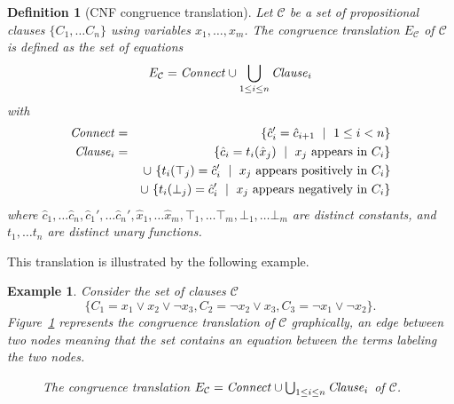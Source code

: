 \documentclass{easychair}
\newtheorem{example}{Example}
\newtheorem{definition}{Definition}
\begin{document}
\begin{definition}[CNF congruence translation]

Let $\mathcal{C}$ be a set of propositional clauses $\{C_1,\ldots C_n\}$ using variables $x_1,\ldots,x_m$.
The \emph{congruence translation} $E_{\mathcal{C}}$ of\/ $\mathcal{C}$ is defined as the set of equations
\begin{equation*}
E_{\mathcal{C}} = {\it Connect} \cup \bigcup_{1 \leq i \leq n}{\it Clause}_i 
\end{equation*}
with
\begin{eqnarray*}
	{\it Connect} &=& \{ \hat{c}_{i}' = \hat{c}_{i+1} \ \mid\ 1 \leq i < n\}\\
        {\it Clause}_i &=& \{ \hat{c}_i = t_i(\hat{x}_j) \ \mid\ x_j \text{ appears in } C_i \}\\
           & & \cup\ \{ t_i(\top_j) = \hat{c}_i' \ \mid\ x_j \text{ appears positively in } C_i \}\\
           & & \cup\ \{ t_i(\bot_j) = \hat{c}_i' \ \mid\ x_j \text{ appears negatively in } C_i \}
\end{eqnarray*}
where $\hat{c}_{1},\dots \hat{c}_{n},\hat{c}_{1}', \dots \hat{c}_{n}',
\hat{x}_1, \dots \hat{x}_m, \top_1, \dots \top_m, \bot_1, \dots \bot_m$ are distinct constants, and $t_1, \dots t_n$ are
distinct unary functions.

\end{definition}

\noindent This translation is illustrated by the following example.

\begin{example}\label{ex:np1}
Consider the set of clauses $\mathcal{C}$
\begin{equation*}
\big\{C_1 = x_1 \vee x_2 \vee \neg x_3, C_2 = \neg x_2 \vee x_3, C_3 = \neg x_1 \vee \neg x_2\big\}.
\end{equation*}
Figure~\ref{fig:npexamplebig} represents the congruence translation of
$\mathcal{C}$ graphically, an edge between two nodes meaning that the set
contains an equation between the terms labeling the two nodes.

\begin{figure}[htb]

\caption{The congruence translation $E_{\mathcal{C}} = {\it Connect} \cup \bigcup_{1 \leq i \leq n}{\it Clause}_i$ of $\mathcal{C}$.}
\label{fig:npexamplebig}
\end{figure}

\end{example}
\end{document}
